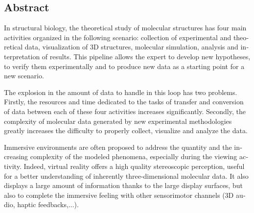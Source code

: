 \begin{otherlanguage}{english}
%
\subsection*{Abstract}
\footnotesize

In structural biology, the theoretical study of molecular structures has four main activities organized in the following scenario: collection of experimental and theoretical data, visualization of 3D structures, molecular simulation, analysis and interpretation of results. This pipeline allows the expert to develop new hypotheses, to verify them experimentally and to produce new data as a starting point for a new scenario.

The explosion in the amount of data to handle in this loop has two problems. Firstly, the resources and time dedicated to the tasks of transfer and conversion of data between each of these four activities increases significantly. Secondly, the complexity of molecular data generated by new experimental methodologies greatly increases the difficulty to properly collect, visualize and analyze the data.

Immersive environments are often proposed to address the quantity and the increasing complexity of the modeled phenomena, especially during the viewing activity. Indeed, virtual reality offers a high quality stereoscopic perception, useful for a better understanding of inherently three-dimensional molecular data. It also displays a large amount of information thanks to the large display surfaces, but also to complete the immersive feeling with other sensorimotor channels (3D audio, haptic feedbacks,...).


\end{otherlanguage}
